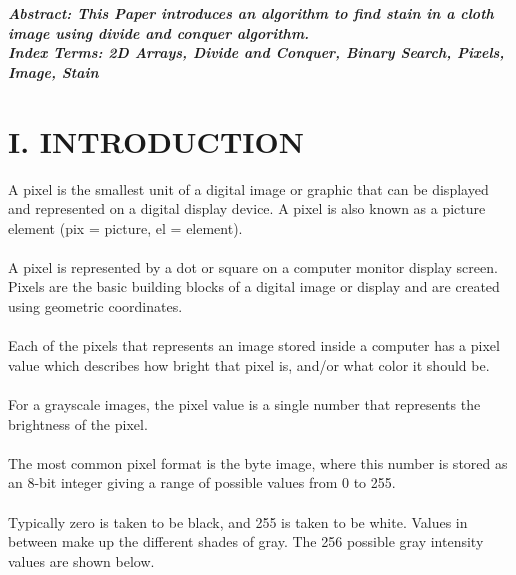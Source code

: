 \documentclass[10pt]{article}
\begin{document}
\begin{multicols*}{2}

    \textbf{\emph{{Abstract}: This Paper introduces an algorithm to find stain in a cloth image using divide and conquer algorithm.}}\\
	
	\textbf{\emph{{Index Terms}: 2D Arrays, Divide and Conquer, Binary Search, Pixels, Image, Stain\\}}


\section*{I. INTRODUCTION}
 
A pixel is the smallest unit of a digital image or graphic that can be displayed and represented on a digital display device. A pixel is also known as a picture element (pix = picture, el = element).\\\\A pixel is represented by a dot or square on a computer monitor display screen. Pixels are the basic building blocks of a digital image or display and are created using geometric coordinates.\\\\Each of the pixels that represents an image stored inside a computer has a pixel value which describes how bright that pixel is, and/or what color it should be. \\\\For a grayscale images, the pixel value is a single number that represents the brightness of the pixel.\\\\The most common  pixel format is the byte image, where this number is stored as an 8-bit integer giving a range of possible values from 0 to 255.\\\\Typically zero is taken to be black, and 255 is taken to be white. Values in between make up the different shades of gray. The 256 possible gray intensity values are shown below.\\\\


\end{multicols*}
\end{document}
